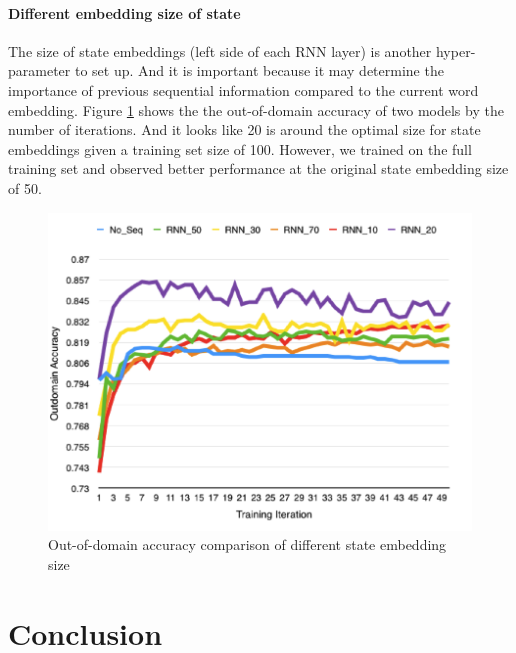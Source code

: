 \documentclass[11pt]{article}
\begin{document}
\paragraph{Different embedding size of state}
The size of state embeddings (left side of each RNN layer) is another hyper-parameter to set up. And it is important because it may determine the importance of previous sequential information compared to the current word embedding. Figure \ref{Leftsize_fig} shows the the out-of-domain accuracy of two models by the number of iterations. And it looks like 20 is around the optimal size for state embeddings given a training set size of 100. However, we trained on the full training set and observed better performance at the original state embedding size of 50.
\begin{figure}
	\includegraphics[scale=0.5]{outdomain_leftsize.png}
	\caption{Out-of-domain accuracy comparison of different state embedding size} \label{Leftsize_fig}
\end{figure}

\section{Conclusion}
\end{document}

